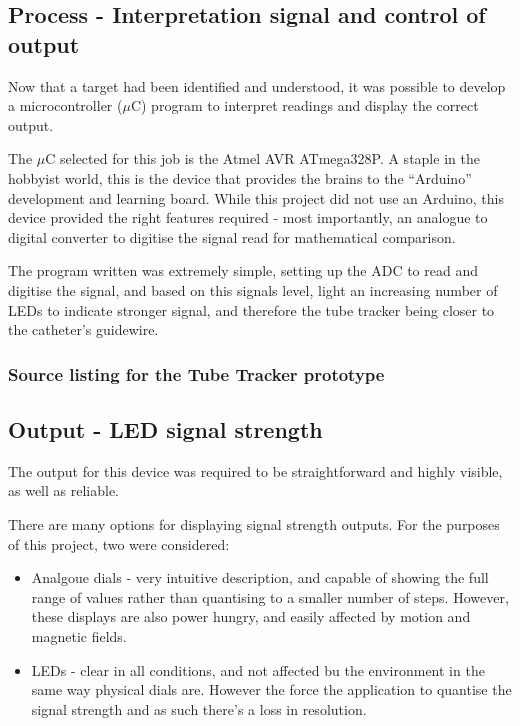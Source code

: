 \documentclass[a4paper]{article}
\begin{document}
        \subsection{Process - Interpretation signal and control of output}
        Now that a target had been identified and understood, it was possible to develop a microcontroller ($\mu$C) program to interpret readings and display the correct output.

        The $\mu$C selected for this job is the Atmel AVR ATmega328P. A staple in the hobbyist world, this is the device that provides the brains to the ``Arduino'' development and learning board. While this project did not use an Arduino, this device provided the right features required - most importantly, an analogue to digital converter to digitise the signal read for mathematical comparison.

        The program written was extremely simple, setting up the ADC to read and digitise the signal, and based on this signals level, light an increasing number of LEDs to indicate stronger signal, and therefore the tube tracker being closer to the catheter's guidewire.
       
        \subsubsection{Source listing for the Tube Tracker prototype}
        

        \subsection{Output - LED signal strength}
        The output for this device was required to be straightforward and highly visible, as well as reliable.

        There are many options for displaying signal strength outputs. For the purposes of this project, two were considered:
        \begin{itemize}
            \item Analgoue dials - very intuitive description, and capable of showing the full range of values rather than quantising to a smaller number of steps. However, these displays are also power hungry, and easily affected by motion and magnetic fields.
            \item LEDs - clear in all conditions, and not affected bu the environment in the same way physical dials are. However the force the application to quantise the signal strength and as such there's a loss in resolution.
        \end{itemize}
\end{document}
